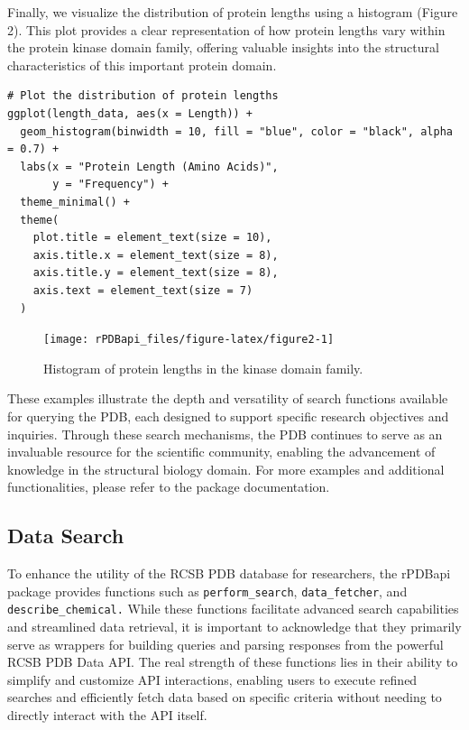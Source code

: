 Finally, we visualize the distribution of protein lengths using a histogram (Figure 2). This plot provides a clear representation of how protein lengths vary within the protein kinase domain family, offering valuable insights into the structural characteristics of this important protein domain.

\begin{verbatim}
# Plot the distribution of protein lengths
ggplot(length_data, aes(x = Length)) +
  geom_histogram(binwidth = 10, fill = "blue", color = "black", alpha = 0.7) +
  labs(x = "Protein Length (Amino Acids)",
       y = "Frequency") +
  theme_minimal() +
  theme(
    plot.title = element_text(size = 10),   
    axis.title.x = element_text(size = 8),  
    axis.title.y = element_text(size = 8),  
    axis.text = element_text(size = 7)      
  )
\end{verbatim}

\begin{figure}[H]
\texttt{[image: rPDBapi\_files/figure-latex/figure2-1]} \caption{Histogram of protein lengths in the kinase domain family.}\label{fig:figure2}
\end{figure}

These examples illustrate the depth and versatility of search functions available for querying the PDB, each designed to support specific research objectives and inquiries. Through these search mechanisms, the PDB continues to serve as an invaluable resource for the scientific community, enabling the advancement of knowledge in the structural biology domain. For more examples and additional functionalities, please refer to the package documentation.

\subsection{Data Search}\label{data-search}

To enhance the utility of the RCSB PDB database for researchers, the rPDBapi package provides functions such as \texttt{perform\_search}, \texttt{data\_fetcher}, and \texttt{describe\_chemical.} While these functions facilitate advanced search capabilities and streamlined data retrieval, it is important to acknowledge that they primarily serve as wrappers for building queries and parsing responses from the powerful RCSB PDB Data API. The real strength of these functions lies in their ability to simplify and customize API interactions, enabling users to execute refined searches and efficiently fetch data based on specific criteria without needing to directly interact with the API itself.

